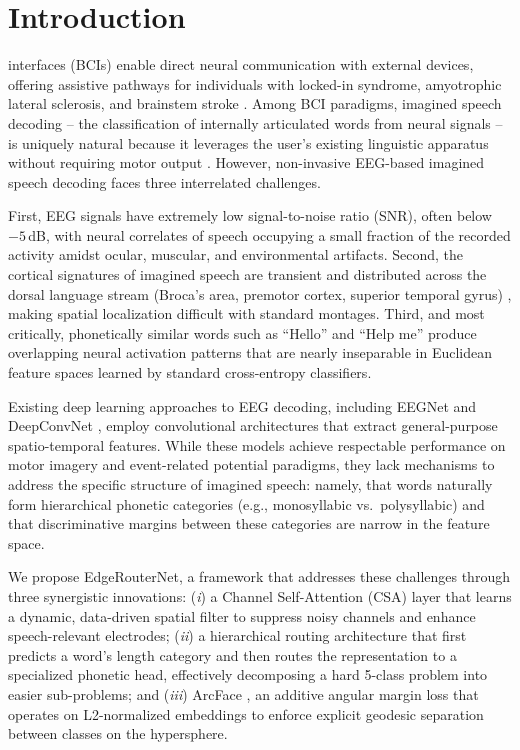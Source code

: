 \documentclass[conference]{IEEEtran}
\newcommand{\method}{EdgeRouterNet}
\begin{document}
\section{Introduction}
 interfaces (BCIs) enable direct neural communication with external devices, offering assistive pathways for individuals with locked-in syndrome, amyotrophic lateral sclerosis, and brainstem stroke \cite{wolpaw2002brain}. Among BCI paradigms, imagined speech decoding -- the classification of internally articulated words from neural signals -- is uniquely natural because it leverages the user's existing linguistic apparatus without requiring motor output \cite{panachakel2021deep}. However, non-invasive EEG-based imagined speech decoding faces three interrelated challenges.

First, EEG signals have extremely low signal-to-noise ratio (SNR), often below $-5$\,dB, with neural correlates of speech occupying a small fraction of the recorded activity amidst ocular, muscular, and environmental artifacts. Second, the cortical signatures of imagined speech are transient and distributed across the dorsal language stream (Broca's area, premotor cortex, superior temporal gyrus) \cite{hickok2007cortical}, making spatial localization difficult with standard montages. Third, and most critically, phonetically similar words such as ``Hello'' and ``Help me'' produce overlapping neural activation patterns that are nearly inseparable in Euclidean feature spaces learned by standard cross-entropy classifiers.

Existing deep learning approaches to EEG decoding, including EEGNet \cite{lawhern2018eegnet} and DeepConvNet \cite{schirrmeister2017deep}, employ convolutional architectures that extract general-purpose spatio-temporal features. While these models achieve respectable performance on motor imagery and event-related potential paradigms, they lack mechanisms to address the specific structure of imagined speech: namely, that words naturally form hierarchical phonetic categories (e.g., monosyllabic vs.\ polysyllabic) and that discriminative margins between these categories are narrow in the feature space.

We propose \method, a framework that addresses these challenges through three synergistic innovations: (\textit{i}) a Channel Self-Attention (CSA) layer that learns a dynamic, data-driven spatial filter to suppress noisy channels and enhance speech-relevant electrodes; (\textit{ii}) a hierarchical routing architecture that first predicts a word's length category and then routes the representation to a specialized phonetic head, effectively decomposing a hard 5-class problem into easier sub-problems; and (\textit{iii}) ArcFace \cite{deng2019arcface}, an additive angular margin loss that operates on L2-normalized embeddings to enforce explicit geodesic separation between classes on the hypersphere.
\end{document}
